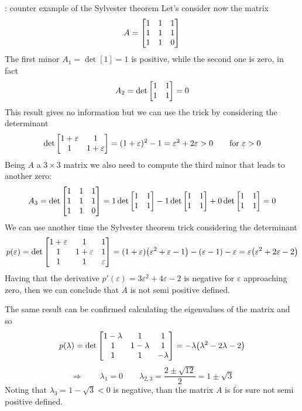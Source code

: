 		\begin{example}{: counter example of the Sylvester theorem}
			Let's consider now the matrix
			\[ A = \begin{bmatrix}  1 & 1 & 1 \\ 1 & 1 & 1 \\ 1 & 1 & 0 \end{bmatrix}  \]
			The first minor $A_1 = \det[1] = 1$ is positive, while the second one is zero, in fact
			\[ A_2 = \det\begin{bmatrix} 1 & 1 \\ 1 & 1 \end{bmatrix} = 0 \]
			This result gives no information but we can use the trick by considering the determinant
			\[ \det\begin{bmatrix} 1 + \varepsilon & 1 \\ 1 & 1 + \varepsilon \end{bmatrix} = (1+\varepsilon)^2 - 1 = \varepsilon^2 +2\varepsilon > 0 \qquad \textrm{for } \varepsilon > 0  \]
			Being $A$ a $3\times3$ matrix we also need to compute the third minor that leads to another zero:
			\[ A_3 = \det\begin{bmatrix}  1 & 1 & 1 \\ 1 & 1 & 1 \\ 1 & 1 & 0 \end{bmatrix} = 1 \det\begin{bmatrix} 1&1\\1&1 \end{bmatrix} - 1 \det\begin{bmatrix} 1&1\\1&1 \end{bmatrix} + 0 \det\begin{bmatrix} 1&1\\1&1 \end{bmatrix} = 0  \]
			We can use another time the Sylvester theorem trick considering the determinant
			\[ p(\varepsilon) = \det\begin{bmatrix}  1+\varepsilon & 1 & 1 \\ 1 & 1+\varepsilon & 1 \\ 1 & 1 & \varepsilon \end{bmatrix} = (1+\varepsilon)\big(\varepsilon^2 + \varepsilon - 1\big) - (\varepsilon-1) - \varepsilon = \varepsilon\big(\varepsilon^2 + 2\varepsilon - 2\big) \]
			Having that the derivative $p'(\varepsilon) =3\varepsilon^2 + 4\varepsilon -2$ is negative for $\varepsilon$ approaching zero, then we can conclude that $A$ is not semi positive defined. \vspace{3mm}
			
			The same result can be confirmed calculating the eigenvalues of the matrix and so
			\[ p(\lambda) = \det\begin{bmatrix}  1 -\lambda & 1 & 1 \\ 1 & 1 -\lambda & 1 \\ 1 & 1 & -\lambda \end{bmatrix} = -\lambda\big(\lambda^2 - 2\lambda - 2\big)  \]
			\[ \Rightarrow \qquad \lambda_1 = 0 \qquad \lambda_{2,3} = \frac{2\pm \sqrt{12}}{2} = 1 \pm \sqrt 3 \]
			Noting that $\lambda_3 = 1-\sqrt 3 <0$ is negative, than the matrix $A$ is for sure not semi positive defined.
		\end{example}
	
	
	
	
	
